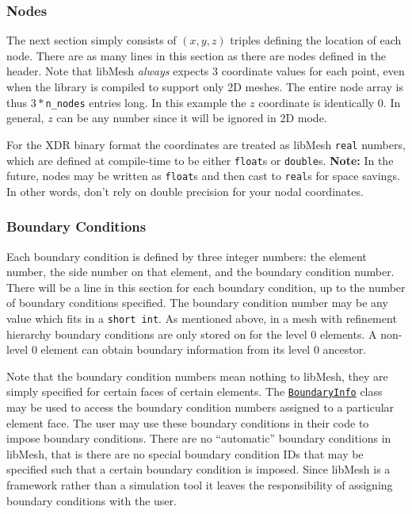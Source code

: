 \documentclass[12pt]{article}
\begin{document}
\subsubsection{Nodes}
The next section simply consists of $(x,y,z)$ triples defining the location of each node.  There are as many lines in this section as there are nodes defined in the header.  Note that libMesh \emph{always} expects 3 coordinate values for each point, even when the library is compiled to support only 2D meshes. The entire node array is thus $3*$\texttt{n\_nodes} entries long.  In this example the $z$ coordinate is identically 0.  In general, $z$ can be any number since it will be ignored in 2D mode.

For the XDR binary format the coordinates are treated as libMesh \texttt{real} numbers, which are defined at compile-time to be either \texttt{float}s or \texttt{double}s.  \textbf{Note:} In the future, nodes may be written as \texttt{float}s and then cast to \texttt{real}s for space savings.  In other words, don't rely on double precision for your nodal coordinates.

\subsubsection{Boundary Conditions}
Each boundary condition is defined by three integer numbers:  the element number, the side number on that element, and the boundary condition number.  There will be a line in this section for each boundary condition, up to the number of boundary conditions specified.  The boundary condition number may be any value which fits in a \texttt{short int}. As mentioned above, in a mesh with refinement hierarchy boundary conditions are only stored on for the level 0 elements. A non-level 0 element can obtain boundary information from its level 0 ancestor.

Note that the boundary condition numbers mean nothing to libMesh, they are simply specified for certain faces of certain elements.  The \href{http://libmesh.sourceforge.net/doxygen/classBoundaryInfo.html}{\texttt{BoundaryInfo}} class may be used to access the boundary condition numbers assigned to a particular element face.  The user may use these boundary conditions in their code to impose boundary conditions.  There are no ``automatic'' boundary conditions in libMesh, that is there are no special boundary condition IDs that may be specified such that a certain boundary condition is imposed.  Since libMesh is a framework rather than a simulation tool it leaves the responsibility of assigning boundary conditions with the user.
\end{document}
